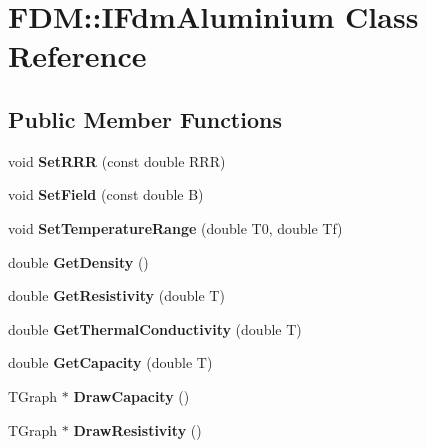 \hypertarget{class_f_d_m_1_1_i_fdm_aluminium}{}\section{F\+D\+M\+:\+:I\+Fdm\+Aluminium Class Reference}
\label{class_f_d_m_1_1_i_fdm_aluminium}
\subsection*{Public Member Functions}
\begin{DoxyCompactItemize}
\item 
\hypertarget{class_f_d_m_1_1_i_fdm_aluminium_afa5173c996920fc5612781fa5b16955e}{}void {\bfseries Set\+R\+R\+R} (const double R\+R\+R)\label{class_f_d_m_1_1_i_fdm_aluminium_afa5173c996920fc5612781fa5b16955e}

\item 
\hypertarget{class_f_d_m_1_1_i_fdm_aluminium_a76d91955eec568215c2d0487c3e0c585}{}void {\bfseries Set\+Field} (const double B)\label{class_f_d_m_1_1_i_fdm_aluminium_a76d91955eec568215c2d0487c3e0c585}

\item 
\hypertarget{class_f_d_m_1_1_i_fdm_aluminium_a59c8fb8aa4d65d5ad361c562a706b65b}{}void {\bfseries Set\+Temperature\+Range} (double T0, double Tf)\label{class_f_d_m_1_1_i_fdm_aluminium_a59c8fb8aa4d65d5ad361c562a706b65b}

\item 
\hypertarget{class_f_d_m_1_1_i_fdm_aluminium_aa9c0d2b62611b90257b28cafeaca58d5}{}double {\bfseries Get\+Density} ()\label{class_f_d_m_1_1_i_fdm_aluminium_aa9c0d2b62611b90257b28cafeaca58d5}

\item 
\hypertarget{class_f_d_m_1_1_i_fdm_aluminium_ac6e89e3e06945a566994760ed7dc8210}{}double {\bfseries Get\+Resistivity} (double T)\label{class_f_d_m_1_1_i_fdm_aluminium_ac6e89e3e06945a566994760ed7dc8210}

\item 
\hypertarget{class_f_d_m_1_1_i_fdm_aluminium_aa57c4a412593631761d0fb34bcf8120e}{}double {\bfseries Get\+Thermal\+Conductivity} (double T)\label{class_f_d_m_1_1_i_fdm_aluminium_aa57c4a412593631761d0fb34bcf8120e}

\item 
\hypertarget{class_f_d_m_1_1_i_fdm_aluminium_aaca3ec15031bf69833bddb3b3f28a85d}{}double {\bfseries Get\+Capacity} (double T)\label{class_f_d_m_1_1_i_fdm_aluminium_aaca3ec15031bf69833bddb3b3f28a85d}

\item 
\hypertarget{class_f_d_m_1_1_i_fdm_aluminium_a67a1a9d9037a0a1e63ea7dc6a1a1269b}{}T\+Graph $\ast$ {\bfseries Draw\+Capacity} ()\label{class_f_d_m_1_1_i_fdm_aluminium_a67a1a9d9037a0a1e63ea7dc6a1a1269b}

\item 
\hypertarget{class_f_d_m_1_1_i_fdm_aluminium_afad4fb19df578939f75b4182218ff9eb}{}T\+Graph $\ast$ {\bfseries Draw\+Resistivity} ()\label{class_f_d_m_1_1_i_fdm_aluminium_afad4fb19df578939f75b4182218ff9eb}

\end{DoxyCompactItemize}
